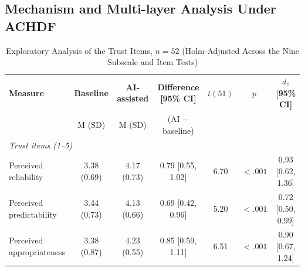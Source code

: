 \documentclass[journal]{IEEEtran}
\theoremstyle{plain}
\theoremstyle{definition}
\providecommand{\DIFdeltex}[1]{{\protect\color{red} \scriptsize #1}} %
\providecommand{\DIFaddbegin}{} %
\providecommand{\DIFaddend}{} %
\providecommand{\DIFdelbegin}{} %
\providecommand{\DIFdelend}{} %
\providecommand{\DIFdel}[1]{\texorpdfstring{\DIFdeltex{#1}}{}} %
\newcommand{\DIFscaledelfig}{0.5}
\newlength{\DIFdelgraphicswidth} %
\newlength{\DIFdelgraphicsheight} %
\newcommand{\DIFaddincludegraphics}[2][]{{\color{blue}\fbox{\DIFOincludegraphics[#1]{#2}}}} %
\newcommand{\DIFdelincludegraphics}[2][]{%
\sbox{\DIFdelgraphicsbox}{\DIFOincludegraphics[#1]{#2}}%
\settoboxwidth{\DIFdelgraphicswidth}{\DIFdelgraphicsbox} %
\settoboxtotalheight{\DIFdelgraphicsheight}{\DIFdelgraphicsbox} %
\scalebox{\DIFscaledelfig}{%
\parbox[b]{\DIFdelgraphicswidth}{\usebox{\DIFdelgraphicsbox}\\[-\baselineskip] \rule{\DIFdelgraphicswidth}{0em}}\llap{\resizebox{\DIFdelgraphicswidth}{\DIFdelgraphicsheight}{%
\setlength{\unitlength}{\DIFdelgraphicswidth}%
\begin{picture}(1,1)%
\thicklines\linethickness{2pt} %
{\color[rgb]{1,0,0}\put(0,0){\framebox(1,1){}}}%
{\color[rgb]{1,0,0}\put(0,0){\line( 1,1){1}}}%
{\color[rgb]{1,0,0}\put(0,1){\line(1,-1){1}}}%
\end{picture}%
}\hspace*{3pt}}} %
} %
\DeclareRobustCommand{\DIFaddbegin}{\DIFOaddbegin \let\includegraphics\DIFaddincludegraphics} %
\DeclareRobustCommand{\DIFaddend}{\DIFOaddend \let\includegraphics\DIFOincludegraphics} %
\DeclareRobustCommand{\DIFdelbegin}{\DIFOdelbegin \let\includegraphics\DIFdelincludegraphics} %
\DeclareRobustCommand{\DIFdelend}{\DIFOaddend \let\includegraphics\DIFOincludegraphics} %
\begin{document}
    \DIFdelbegin \subsection{\DIFdel{Mechanism and Multi-layer Analysis Under ACHDF}}
\addtocounter{subsection}{-1}%
\DIFdelend \DIFaddbegin \begin{table}[t]
        \caption{Exploratory Analysis of the Trust Items, $n=52$ (Holm-Adjusted Across the Nine Subscale and Item Tests)}
        \label{tab:subscales}
        \centering
        \begin{tabular}{l c c c c c c}
            \toprule
            \textbf{Measure} & \textbf{Baseline} & \textbf{AI-assisted} & \textbf{Difference [95\% CI]} & \textbf{$t(51)$} & \textbf{$p$} & \textbf{$d_z$ [95\% CI]} \\
            & M (SD) & M (SD) & (AI $-$ baseline) & & & \\
            \midrule
            \multicolumn{7}{l}{\emph{Trust items (1--5)}} \\
            Perceived reliability & 3.38 (0.69) & 4.17 (0.73) & 0.79 [0.55, 1.02] & 6.70 & $<.001$ & 0.93 [0.62, 1.36] \\
            Perceived predictability & 3.44 (0.73) & 4.13 (0.66) & 0.69 [0.42, 0.96] & 5.20 & $<.001$ & 0.72 [0.50, 0.99] \\
            Perceived appropriateness & 3.38 (0.87) & 4.23 (0.55) & 0.85 [0.59, 1.11] & 6.51 & $<.001$ & 0.90 [0.67, 1.24] \\
            \bottomrule
        \end{tabular}
    \end{table}
\DIFaddend 
\end{document}
